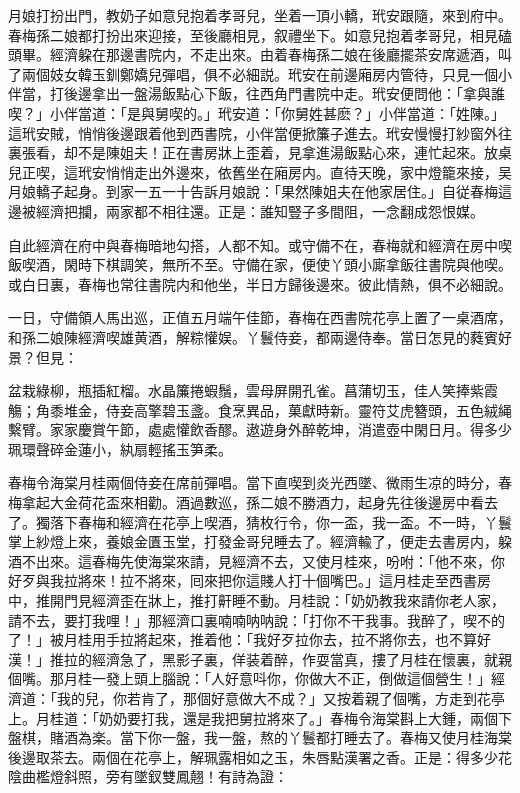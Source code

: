 月娘打扮出門，教奶子如意兒抱着孝哥兒，坐着一頂小轎，玳安跟隨，來到府中。春梅孫二娘都打扮出來迎接，至後廳相見，叙禮坐下。如意兒抱着孝哥兒，相見磕頭畢。經濟躱在那邊書院内，不走出來。由着春梅孫二娘在後廳擺茶安席遞酒，叫了兩個妓女韓玉釧鄭嬌兒彈唱，俱不必細説。玳安在前邊廂房内管待，只見一個小伴當，打後邊拿出一盤湯飯點心下飯，往西角門書院中走。玳安便問他：「拿與誰喫？」小伴當道：「是與舅喫的。」玳安道：「你舅姓甚麽？」小伴當道：「姓陳。」這玳安賊，悄悄後邊跟着他到西書院，小伴當便掀簾子進去。玳安慢慢打紗窗外往裏張看，却不是陳姐夫！正在書房牀上歪着，見拿進湯飯點心來，連忙起來。放桌兒正喫，這玳安悄悄走出外邊來，依舊坐在廂房内。直待天晚，家中燈籠來接，吴月娘轎子起身。到家一五一十告訴月娘說：「果然陳姐夫在他家居住。」自従春梅這邊被經濟把攔，兩家都不相往還。正是：誰知豎子多間阻，一念翻成怨恨媒。

自此經濟在府中與春梅暗地勾搭，人都不知。或守備不在，春梅就和經濟在房中喫飯喫酒，閑時下棋調笑，無所不至。守備在家，便使丫頭小廝拿飯往書院與他喫。或白日裏，春梅也常往書院内和他坐，半日方歸後邊來。彼此情熱，俱不必細說。

一日，守備領人馬出巡，正值五月端午佳節，春梅在西書院花亭上置了一桌酒席，和孫二娘陳經濟喫雄黄酒，解粽懽娱。丫鬟侍妾，都兩邊侍奉。當日怎見的蕤賓好景？但見：

\begin{myquote}
盆栽綠柳，瓶插紅榴。水晶簾捲蝦鬚，雲母屏開孔雀。菖蒲切玉，佳人笑捧紫霞觴；角黍堆金，侍妾高擎碧玉盞。食烹異品，菓獻時新。靈符艾虎簪頭，五色絨䋲繫臂。家家慶賞午節，處處懽飲香醪。遨遊身外醉乾坤，消遣壺中閑日月。得多少珮環聲碎金蓮小，紈扇輕搖玉笋柔。
\end{myquote}

春梅令海棠月桂兩個侍妾在席前彈唱。當下直喫到炎光西墜、微雨生凉的時分，春梅拿起大金荷花盃來相勸。酒過數巡，孫二娘不勝酒力，起身先往後邊房中看去了。獨落下春梅和經濟在花亭上喫酒，猜枚行令，你一盃，我一盃。不一時，丫鬟掌上紗燈上來，養娘金匱玉堂，打發金哥兒睡去了。經濟輸了，便走去書房内，躱酒不出來。這春梅先使海棠來請，見經濟不去，又使月桂來，吩咐：「他不來，你好歹與我拉將來！拉不將來，囘來把你這賤人打十個嘴巴。」這月桂走至西書房中，推開門見經濟歪在牀上，推打鼾睡不動。月桂說：「奶奶教我來請你老人家，請不去，要打我哩！」那經濟口裏喃喃呐呐說：「打你不干我事。我醉了，喫不的了！」被月桂用手拉將起來，推着他：「我好歹拉你去，拉不將你去，也不算好漢！」推拉的經濟急了，黑影子裏，佯装着醉，作耍當真，摟了月桂在懷裏，就親個嘴。那月桂一發上頭上腦說：「人好意呌你，你做大不正，倒做這個營生！」經濟道：「我的兒，你若肯了，那個好意做大不成？」又按着親了個嘴，方走到花亭上。月桂道：「奶奶要打我，還是我把舅拉將來了。」春梅令海棠斟上大鍾，兩個下盤棋，賭酒為楽。當下你一盤，我一盤，熬的丫鬟都打睡去了。春梅又使月桂海棠後邊取茶去。兩個在花亭上，解珮露相如之玉，朱唇點漢署之香。正是：得多少花陰曲檻燈斜照，旁有墜釵雙鳳翹！有詩為證：

